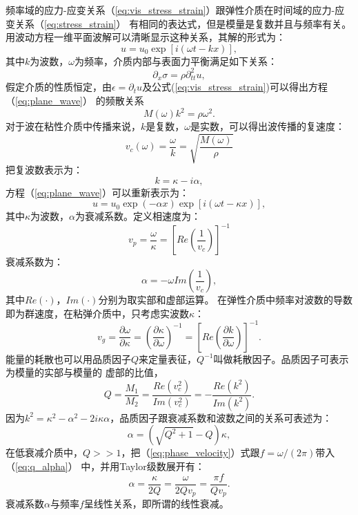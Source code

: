 频率域的应力-应变关系（\ref{eq:vis_stress_strain}）跟弹性介质在时间域的应力-应变关系（\ref{eq:stress_strain}）
有相同的表达式，但是模量是复数并且与频率有关。用波动方程一维平面波解可以清晰显示这种关系，其解的形式为：
\begin{equation}
	u=u_0\exp[i(\omega t-kx)],
	\label{eq:plane_wave}
\end{equation}
其中$k$为波数，$\omega$为频率，介质内部与表面力平衡满足如下关系：
\begin{equation}
	\partial_x\sigma=\rho\partial^2_{tt}u,
\end{equation}
假定介质的性质恒定，由$\epsilon=\partial_t u$及公式(\ref{eq:vis_stress_strain})可以得出方程（\ref{eq:plane_wave}）
的频散关系
\begin{equation}
	M(\omega)k^2=\rho\omega^2.
\end{equation}
对于波在粘性介质中传播来说，$k$是复数，$\omega$是实数，可以得出波传播的复速度：
\begin{equation}
	v_c(\omega)=\frac{\omega}{k}=\sqrt{\frac{M(\omega)}{\rho}}
	\label{eq:vc}
\end{equation}
把复波数表示为：
\begin{equation}
	k=\kappa -i\alpha,
\end{equation}
\newpage
\hspace{-2.0em}方程（\ref{eq:plane_wave}）可以重新表示为：
\begin{equation}
	u=u_0\exp(-\alpha x)\exp[i(\omega t-\kappa x)],
\end{equation}
其中$\kappa$为波数，$\alpha$为衰减系数。定义相速度为：
\begin{equation}
	v_p=\frac{\omega}{\kappa}=[Re(\frac{1}{v_c})]^{-1}
	\label{eq:phase_velocity}
\end{equation}
衰减系数为：
\begin{equation}
	\alpha=-\omega Im(\frac{1}{v_c}),
	\label{eq:alpha}
\end{equation}
其中$Re(\cdot)$，$Im(\cdot)$分别为取实部和虚部运算。
在弹性介质中频率对波数的导数即为群速度，在粘弹介质中，只考虑实波数$\kappa$：
\begin{equation}
	v_g=\frac{\partial \omega}{\partial \kappa}=(\frac{\partial \kappa}{\partial \omega})^{-1}
	=[Re(\frac{\partial k}{\partial \omega})]^{-1}.
\end{equation}
能量的耗散也可以用品质因子$Q$来定量表征，$Q^{-1}$叫做耗散因子。品质因子可表示为模量的实部与模量的
虚部的比值，
\begin{equation}
	Q=\frac{M_1}{M_2}=\frac{Re(v_c^2)}{Im(v_c^2)}=-\frac{Re(k^2)}{Im(k^2)}.
	\label{eq:qm}
\end{equation}
因为$k^2=\kappa^2-\alpha^2-2i\kappa\alpha$，品质因子跟衰减系数和波数之间的关系可表述为：
\begin{equation}
	\alpha=(\sqrt{Q^2+1}-Q)\kappa,
	\label{eq:q_alpha}
\end{equation}
在低衰减介质中，$Q>>1$，把（\ref{eq:phase_velocity}）式跟$f=\omega/(2\pi)$带入（\ref{eq:q_alpha}）
中，并用Taylor级数展开有：
\begin{equation}
	\alpha=\frac{\kappa}{2Q}=\frac{\omega}{2Qv_p}=\frac{\pi f}{Qv_p}.
	\label{eq:linear_visco}
\end{equation}
衰减系数$\alpha$与频率$f$呈线性关系，即所谓的线性衰减。


